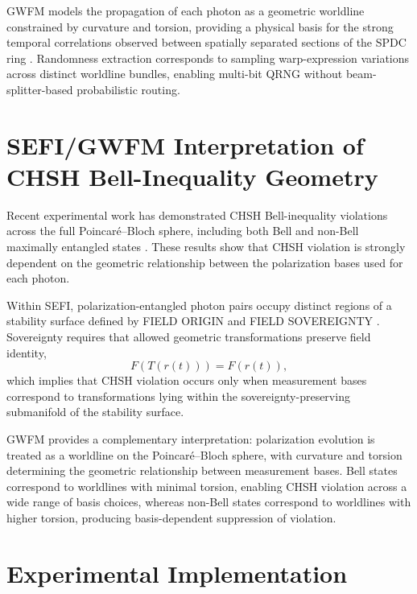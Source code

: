 \documentclass[aip, adv, reprint, superscriptaddress]{revtex4-2}
\begin{document}
GWFM models the propagation of each photon as a geometric worldline constrained by 
curvature and torsion, providing a physical basis for the strong temporal correlations 
observed between spatially separated sections of the SPDC ring \cite{DuttonGWFM}. 
Randomness extraction corresponds to sampling warp-expression variations across 
distinct worldline bundles, enabling multi-bit QRNG without beam-splitter-based 
probabilistic routing.

\section{SEFI/GWFM Interpretation of CHSH Bell-Inequality Geometry}


Recent experimental work has demonstrated CHSH Bell-inequality violations across the 
full Poincar\'e--Bloch sphere, including both Bell and non-Bell maximally entangled 
states \cite{CardosoIsidoro2026}. These results show that CHSH violation is strongly 
dependent on the geometric relationship between the polarization bases used for each 
photon.

Within SEFI, polarization-entangled photon pairs occupy distinct regions of a stability 
surface defined by FIELD ORIGIN and FIELD SOVEREIGNTY \cite{DuttonSEFI}. 
Sovereignty requires that allowed geometric transformations preserve field identity,
\begin{equation}
F(T(r(t))) = F(r(t)),
\end{equation}
which implies that CHSH violation occurs only when measurement bases correspond to 
transformations lying within the sovereignty-preserving submanifold of the stability 
surface.

GWFM provides a complementary interpretation: polarization evolution is treated as a 
worldline on the Poincar\'e--Bloch sphere, with curvature and torsion determining the 
geometric relationship between measurement bases. Bell states correspond to worldlines 
with minimal torsion, enabling CHSH violation across a wide range of basis choices, 
whereas non-Bell states correspond to worldlines with higher torsion, producing 
basis-dependent suppression of violation.

\section{Experimental Implementation}

\end{document}
